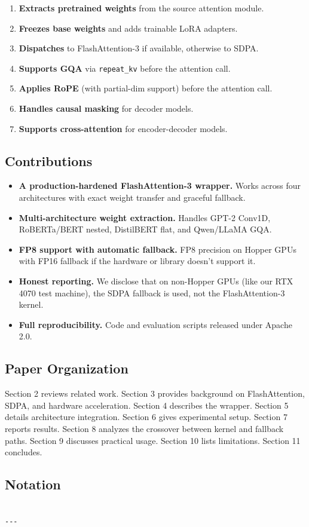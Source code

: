 \begin{enumerate}
\item \textbf{Extracts pretrained weights} from the source attention module.
\item \textbf{Freezes base weights} and adds trainable LoRA adapters.
\item \textbf{Dispatches} to FlashAttention-3 if available, otherwise to SDPA.
\item \textbf{Supports GQA} via \texttt{repeat\_kv} before the attention call.
\item \textbf{Applies RoPE} (with partial-dim support) before the attention call.
\item \textbf{Handles causal masking} for decoder models.
\item \textbf{Supports cross-attention} for encoder-decoder models.

\end{enumerate}
\subsection{Contributions}

\begin{itemize}
\item \textbf{A production-hardened FlashAttention-3 wrapper.} Works across four
  architectures with exact weight transfer and graceful fallback.
\item \textbf{Multi-architecture weight extraction.} Handles GPT-2 Conv1D,
  RoBERTa/BERT nested, DistilBERT flat, and Qwen/LLaMA GQA.
\item \textbf{FP8 support with automatic fallback.} FP8 precision on Hopper GPUs
  with FP16 fallback if the hardware or library doesn't support it.
\item \textbf{Honest reporting.} We disclose that on non-Hopper GPUs (like our
  RTX 4070 test machine), the SDPA fallback is used, not the FlashAttention-3
  kernel.
\item \textbf{Full reproducibility.} Code and evaluation scripts released under
  Apache 2.0.

\end{itemize}
\subsection{Paper Organization}

Section 2 reviews related work. Section 3 provides background on 
FlashAttention, SDPA, and hardware acceleration. Section 4 describes the 
wrapper. Section 5 details architecture integration. Section 6 gives 
experimental setup. Section 7 reports results. Section 8 analyzes the 
crossover between kernel and fallback paths. Section 9 discusses practical 
usage. Section 10 lists limitations. Section 11 concludes.



\subsection{Notation}

\begin{lstlisting}

---
\end{lstlisting}